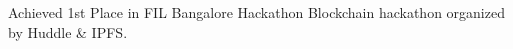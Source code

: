 \item
{Achieved 1st Place in FIL Bangalore Hackathon}
{Blockchain hackathon organized by Huddle \& IPFS.}
